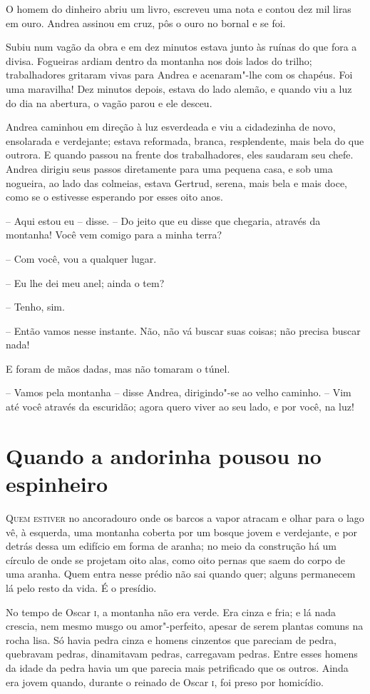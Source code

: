 O homem do dinheiro abriu um livro, escreveu uma nota e contou dez mil
liras em ouro. Andrea assinou em cruz, pôs o ouro no bornal e se foi.

Subiu num vagão da obra e em dez minutos estava junto às ruínas do que
fora a divisa. Fogueiras ardiam dentro da montanha nos dois lados do
trilho; trabalhadores gritaram vivas para Andrea e acenaram"-lhe com
os chapéus. Foi uma maravilha! Dez minutos depois, estava do lado
alemão, e quando viu a luz do dia na abertura, o vagão parou e ele
desceu.

Andrea caminhou em direção à luz esverdeada e viu a cidadezinha de novo,
ensolarada e verdejante; estava reformada, branca, resplendente, mais
bela do que outrora. E quando passou na frente dos trabalhadores, eles
saudaram seu chefe. Andrea dirigiu seus passos diretamente para uma
pequena casa, e sob uma nogueira, ao lado das colmeias, estava Gertrud,
serena, mais bela e mais doce, como se o estivesse esperando por esses
oito anos.

-- Aqui estou eu -- disse. -- Do jeito que eu disse que chegaria, através
da montanha! Você vem comigo para a minha terra?

-- Com você, vou a qualquer lugar.

-- Eu lhe dei meu anel; ainda o tem?

-- Tenho, sim.

-- Então vamos nesse instante. Não, não vá buscar suas coisas; não
precisa buscar nada!

E foram de mãos dadas, mas não tomaram o túnel.

-- Vamos pela montanha -- disse Andrea, dirigindo"-se ao velho caminho. --
Vim até você através da escuridão; agora quero viver ao seu lado, e por
você, na luz!

\chapter{Quando a andorinha pousou no espinheiro}


\textsc{Quem estiver} no ancoradouro onde os barcos a vapor atracam e olhar para
o lago vê, à esquerda, uma montanha coberta por um bosque jovem e
verdejante, e por detrás dessa um edifício em forma de aranha; no meio
da construção há um círculo de onde se projetam oito alas, como oito
pernas que saem do corpo de uma aranha. Quem entra nesse prédio não sai
quando quer; alguns permanecem lá pelo resto da vida. É o presídio.

No tempo de Oscar \textsc{i}, a montanha não era verde. Era cinza e fria; e lá
nada crescia, nem mesmo musgo ou amor"-perfeito, apesar de serem
plantas comuns na rocha lisa. Só havia pedra cinza e homens cinzentos
que pareciam de pedra, quebravam pedras, dinamitavam pedras, carregavam
pedras. Entre esses homens da idade da pedra havia um que parecia mais
petrificado que os outros. Ainda era jovem quando, durante o reinado de
Oscar \textsc{i}, foi preso por homicídio.

